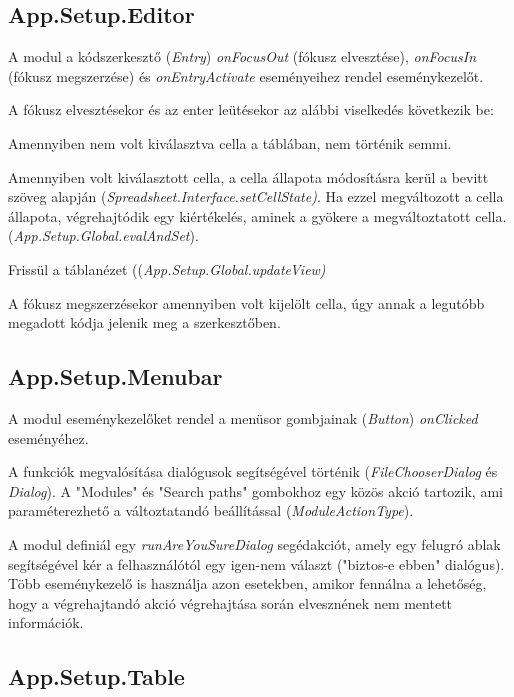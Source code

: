 \subsection{App.Setup.Editor}

A modul a kódszerkesztő (\textit{Entry}) \textit{onFocusOut} (fókusz elvesztése), \textit{onFocusIn} (fókusz megszerzése) és \textit{onEntryActivate} eseményeihez rendel eseménykezelőt.

A fókusz elvesztésekor és az enter leütésekor az alábbi viselkedés következik be:
\begin{compactenum}
	\item Amennyiben nem volt kiválasztva cella a táblában, nem történik semmi.
	\item Amennyiben volt kiválasztott cella, a cella állapota módosításra kerül a bevitt szöveg alapján (\mbox{\textit{Spreadsheet.Interface.setCellState)}}. Ha ezzel megváltozott a cella állapota, végrehajtódik egy kiértékelés, aminek a gyökere a megváltoztatott cella. (\mbox{\textit{App.Setup.Global.evalAndSet}}).
	\item Frissül a táblanézet ((\mbox{\textit{App.Setup.Global.updateView)}}
\end{compactenum}

A fókusz megszerzésekor amennyiben volt kijelölt cella, úgy annak a legutóbb megadott kódja jelenik meg a szerkesztőben.

\subsection{App.Setup.Menubar}

A modul eseménykezelőket rendel a menüsor gombjainak (\textit{Button}) \textit{onClicked} eseményéhez.

A funkciók megvalósítása dialógusok segítségével történik (\textit{FileChooserDialog} és \textit{Dialog}). A "Modules" és "Search paths" gombokhoz egy közös akció tartozik, ami paraméterezhető a változtatandó beállítással (\textit{ModuleActionType}). 

A modul definiál egy \textit{runAreYouSureDialog} segédakciót, amely egy felugró ablak segítségével kér a felhasználótól egy igen-nem választ ("biztos-e ebben" dialógus). Több eseménykezelő is használja azon esetekben, amikor fennálna a lehetőség, hogy a végrehajtandó akció végrehajtása során elvesznének nem mentett információk.

\subsection{App.Setup.Table}

